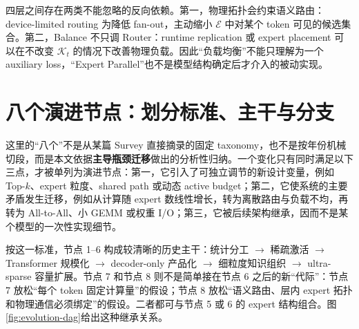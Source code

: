 \documentclass[10pt,a4paper,fontset=none]{ctexart}
\newcommand{\term}[1]{\textbf{#1}}
\begin{document}
四层之间存在两类不能忽略的反向依赖。第一，物理拓扑会约束语义路由：device-limited routing 为降低 fan-out，主动缩小 $\mathcal{E}$ 中对某个 token 可见的候选集合。第二，Balance 不只调 Router：runtime replication 或 expert placement 可以在不改变 $\mathcal{K}_t$ 的情况下改善物理负载。因此“负载均衡”不能只理解为一个 auxiliary loss，“Expert Parallel”也不是模型结构确定后才介入的被动实现。

\section{八个演进节点：划分标准、主干与分支}

这里的“八个”不是从某篇 Survey 直接摘录的固定 taxonomy，也不是按年份机械切段，而是本文依据\term{主导瓶颈迁移}做出的分析性归纳。一个变化只有同时满足以下三点，才被单列为演进节点：第一，它引入了可独立调节的新设计变量，例如 Top-$k$、expert 粒度、shared path 或动态 active budget；第二，它使系统的主要矛盾发生迁移，例如从计算随 expert 数线性增长，转为离散路由与负载不均，再转为 All-to-All、小 GEMM 或权重 I/O；第三，它被后续架构继承，因而不是某个模型的一次性实现细节。

按这一标准，节点 1--6 构成较清晰的历史主干：统计分工 $\rightarrow$ 稀疏激活 $\rightarrow$ Transformer 规模化 $\rightarrow$ decoder-only 产品化 $\rightarrow$ 细粒度知识组织 $\rightarrow$ ultra-sparse 容量扩展。节点 7 和节点 8 则不是简单接在节点 6 之后的新“代际”：节点 7 放松“每个 token 固定计算量”的假设；节点 8 放松“语义路由、层内 expert 拓扑和物理通信必须绑定”的假设。二者都可与节点 5 或 6 的 expert 结构组合。图\ref{fig:evolution-dag}给出这种继承关系。
\end{document}
